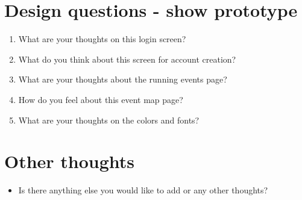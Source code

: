 \documentclass{article}
\begin{document}
\section*{Design questions - show prototype}
\begin{enumerate}[label=\textbf{Question \arabic*:}]
    \item What are your thoughts on this login screen?\\
        \vspace{2cm}
    \item What do you think about this screen for account creation?\\
        \vspace{2cm}
    \item What are your thoughts about the running events page?\\
        \vspace{2cm}
    \item How do you feel about this event map page?\\
        \vspace{2cm}
    \item What are your thoughts on the colors and fonts?\\
        \vspace{2cm}
\end{enumerate}
\thispagestyle{empty}
\section*{Other thoughts}
\begin{itemize}[label=]
    \item Is there anything else you would like to add or any other thoughts?\\
    \vspace{2cm}
\end{itemize}
\thispagestyle{empty}
\end{document}

